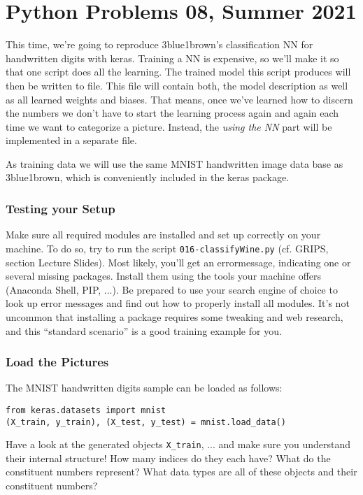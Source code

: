 \documentclass[
	english,
	fontsize=10pt,
	parskip=half,
	titlepage=true,
	DIV=12
]{scrartcl}
\begin{document}
\part*{Python Problems 08, Summer 2021}
This time, we're going to reproduce 3blue1brown's classification NN for handwritten digits with keras. Training a NN is expensive, so we'll make it so that one script does all the learning. The trained model this script produces will then be written to file. This file will contain both, the model description as well as all learned weights and biases. That means, once we've learned how to discern the numbers we don't have to start the learning process again and again each time we want to categorize a picture. Instead, the \emph{using the NN} part will be implemented in a separate file.

As training data we will use the same MNIST handwritten image data base as 3blue1brown, which is conveniently included in the keras package.

\section{Testing your Setup}
Make sure all required modules are installed and set up correctly on your machine. To do so, try to run the script \texttt{016-classifyWine.py} (cf. GRIPS, section Lecture Slides). Most likely, you'll get an errormessage, indicating one or several missing packages. Install them using the tools your machine offers (Anaconda Shell, PIP, ...). Be prepared to use your search engine of choice to look up error messages and find out how to properly install all modules. It's not uncommon that installing a package requires some tweaking and web research, and this \enquote{standard scenario} is a good training example for you.

\section{Load the Pictures}
The MNIST handwritten digits sample can be loaded as follows:

\begin{verbatim}
from keras.datasets import mnist
(X_train, y_train), (X_test, y_test) = mnist.load_data()
\end{verbatim}

Have a look at the generated objects \texttt{X\_train}, ... and make sure you understand their internal structure! How many indices do they each have? What do the constituent numbers represent? What data types are all of these objects and their constituent numbers?
\end{document}
